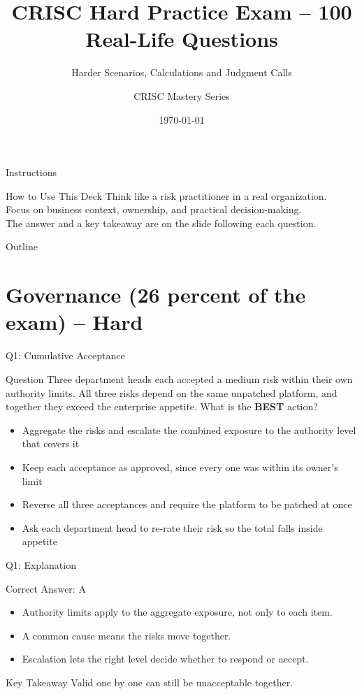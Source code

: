 \documentclass[aspectratio=169]{beamer}
\title{CRISC Hard Practice Exam -- 100 Real-Life Questions}
\subtitle{Harder Scenarios, Calculations and Judgment Calls}
\author{CRISC Mastery Series}
\date{\today}
\newcommand{\hq}[7]{%
	\begin{frame}{Q#1: #2}
		\begin{block}{Question}
			#3
		\end{block}
		\begin{itemize}
			#4
		\end{itemize}
	\end{frame}
	\begin{frame}{Q#1: Explanation}
		\begin{block}{Correct Answer: #5}
			\begin{itemize}
				#6
			\end{itemize}
		\end{block}
		\begin{alertblock}{Key Takeaway}
			#7
		\end{alertblock}
	\end{frame}
}
\begin{document}
	\begin{frame}
		\titlepage
	\end{frame}

	\begin{frame}{Instructions}
		\begin{alertblock}{How to Use This Deck}
			Think like a risk practitioner in a real organization.\\
			Focus on business context, ownership, and practical decision-making.\\
			The answer and a key takeaway are on the slide following each question.
		\end{alertblock}
	\end{frame}

	\begin{frame}{Outline}
		\tableofcontents
	\end{frame}

	\section{Governance (26 percent of the exam) -- Hard}

	\hq{1}{Cumulative Acceptance}
	{Three department heads each accepted a medium risk within their own authority limits. All three risks depend on the same unpatched platform, and together they exceed the enterprise appetite. What is the \textbf{BEST} action?}
	{\item[\textbf{(A)}] Aggregate the risks and escalate the combined exposure to the authority level that covers it
		\item[\textbf{(B)}] Keep each acceptance as approved, since every one was within its owner's limit
		\item[\textbf{(C)}] Reverse all three acceptances and require the platform to be patched at once
		\item[\textbf{(D)}] Ask each department head to re-rate their risk so the total falls inside appetite}
	{A}
	{\item Authority limits apply to the aggregate exposure, not only to each item.
		\item A common cause means the risks move together.
		\item Escalation lets the right level decide whether to respond or accept.}
	{Valid one by one can still be unacceptable together.}
\end{document}
